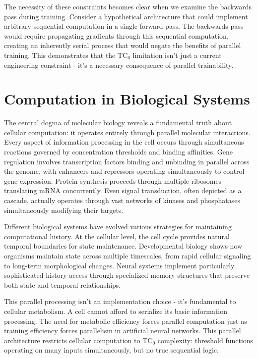 \documentclass[12pt]{article}
\begin{document}
The necessity of these constraints becomes clear when we examine the backwards pass during training. Consider a hypothetical architecture that could implement arbitrary sequential computation in a single forward pass. The backwards pass would require propagating gradients through this sequential computation, creating an inherently serial process that would negate the benefits of parallel training. This demonstrates that the $\text{TC}_0$ limitation isn't just a current engineering constraint - it's a necessary consequence of parallel trainability.

\section{Computation in Biological Systems}

The central dogma of molecular biology reveals a fundamental truth about cellular computation: it operates entirely through parallel molecular interactions. Every aspect of information processing in the cell occurs through simultaneous reactions governed by concentration thresholds and binding affinities. Gene regulation involves transcription factors binding and unbinding in parallel across the genome, with enhancers and repressors operating simultaneously to control gene expression. Protein synthesis proceeds through multiple ribosomes translating mRNA concurrently. Even signal transduction, often depicted as a cascade, actually operates through vast networks of kinases and phosphatases simultaneously modifying their targets.

Different biological systems have evolved various strategies for maintaining computational history. At the cellular level, the cell cycle provides natural temporal boundaries for state maintenance. Developmental biology shows how organisms maintain state across multiple timescales, from rapid cellular signaling to long-term morphological changes. Neural systems implement particularly sophisticated history access through specialized memory structures that preserve both state and temporal relationships.

This parallel processing isn't an implementation choice - it's fundamental to cellular metabolism. A cell cannot afford to serialize its basic information processing. The need for metabolic efficiency forces parallel computation just as training efficiency forces parallelism in artificial neural networks. This parallel architecture restricts cellular computation to $\text{TC}_0$ complexity: threshold functions operating on many inputs simultaneously, but no true sequential logic.
\end{document}
